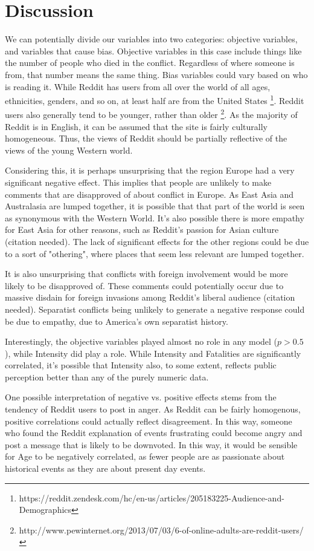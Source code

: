 \section{Discussion}
We can potentially divide our variables into two categories: objective variables, and variables that cause bias. Objective variables in this case include things like the number of people who died in the conflict. Regardless of where someone is from, that number means the same thing. Bias variables could vary based on who is reading it. While Reddit has users from all over the world of all ages, ethnicities, genders, and so on, at least half are from the United States \footnote{https://reddit.zendesk.com/hc/en-us/articles/205183225-Audience-and-Demographics}. Reddit users also generally tend to be younger, rather than older \footnote{http://www.pewinternet.org/2013/07/03/6-of-online-adults-are-reddit-users/}. As the majority of Reddit is in English, it can be assumed that the site is fairly culturally homogeneous. Thus, the views of Reddit should be partially reflective of the views of the young Western world.

Considering this, it is perhaps unsurprising that the region Europe had a very significant negative effect. This implies that people are unlikely to make comments that are disapproved of about conflict in Europe. As East Asia and Australasia are lumped together, it is possible that that part of the world is seen as synonymous with the Western World. It's also possible there is more empathy for East Asia for other reasons, such as Reddit's passion for Asian culture (citation needed). The lack of significant effects for the other regions could be due to a sort of "othering", where places that seem less relevant are lumped together.

It is also unsurprising that conflicts with foreign involvement would be more likely to be disapproved of. These comments could potentially occur due to massive disdain for foreign invasions among Reddit's liberal audience (citation needed). Separatist conflicts being unlikely to generate a negative response could be due to empathy, due to America's own separatist history.

Interestingly, the objective variables played almost no role in any model ($p > 0.5$), while Intensity did play a role. While Intensity and Fatalities are significantly correlated, it's possible that Intensity also, to some extent, reflects public perception better than any of the purely numeric data. 

One possible interpretation of negative vs. positive effects stems from the tendency of Reddit users to post in anger. As Reddit can be fairly homogenous, positive correlations could actually reflect disagreement. In this way, someone who found the Reddit explanation of events frustrating could become angry and post a message that is likely to be downvoted. In this way, it would be sensible for Age to be negatively correlated, as fewer people are as passionate about historical events as they are about present day events.